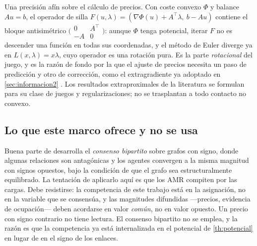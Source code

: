 \begin{observacion}
\label{obs:bloque-antisimetrico}
Una precisión afín sobre el cálculo de precios. Con coste convexo $\Phi$ y
balance $Au=b$, el operador de silla
$F(u,\lambda)=(\nabla\Phi(u)+A^{\!\top}\lambda,\ b-Au)$ contiene el bloque
antisimétrico $\bigl(\begin{smallmatrix}0&A^{\!\top}\\-A&0\end{smallmatrix}\bigr)$:
aunque $\Phi$ tenga potencial, iterar $F$ no es descender una función en todas
sus coordenadas, y el método de Euler diverge ya en $L(x,\lambda)=x\lambda$, cuyo
operador es una rotación pura. Es la parte \emph{rotacional} del juego, y es la
razón de fondo por la que el ajuste de precios necesita un paso de predicción y
otro de corrección, como el extragradiente ya adoptado en
\cref{sec:informacion2} \cite{mayorga2026m1}. Los resultados extraproximales de
la literatura se formulan para su clase de juegos y regularizaciones; no se
trasplantan a todo contacto no convexo.
\end{observacion}

\subsection{Lo que este marco ofrece y no se usa}

\begin{observacion}
\label{obs:bipartito}
Buena parte de \cite{zhao2024hybrid} desarrolla el \emph{consenso bipartito}
sobre grafos con signo, donde algunas relaciones son antagónicas y los agentes
convergen a la misma magnitud con signos opuestos, bajo la condición de que el
grafo sea estructuralmente equilibrado. La tentación de aplicarlo aquí es que
los AMR compiten por las cargas. Debe resistirse: la competencia de este trabajo
está en la asignación, no en la variable que se consensúa, y las magnitudes
difundidas —precios, evidencia de ocupación— deben acordarse en valor
\emph{común}, no en valor opuesto. Un precio con signo contrario no tiene
lectura. El consenso bipartito no se emplea, y la razón es que la competencia ya
está internalizada en el potencial de \cref{th:potencial} en lugar de en el
signo de los enlaces.
\end{observacion}

